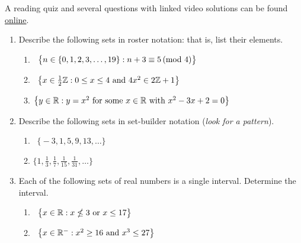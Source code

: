 \begin{exercises}{}{}
	A reading quiz and several questions with linked video solutions can be found \href{http://www.math.uci.edu/~ndonalds/math13/selftest/4-1-subset.html}{online}.



	\begin{enumerate}
	  \item Describe the following sets in roster notation: that is, list their elements.
		\begin{enumerate}
		  \item {} \ $\bigl\{n\in\{0,1,2,3,\ldots,19\}:n+3\equiv 5\negthickspace\pmod{4}\bigr\}$
		  \setcounter{enumii}{2}
		  \item {} \ $\bigl\{x\in \frac 12\mathbb{Z}: 0\le x\le 4\text{ and }4x^2\in 2\mathbb{Z}+1\bigr\}$
		  \setcounter{enumii}{4}
		  \item $\bigl\{y\in\mathbb{R}:y=x^2\text{ for some $x\in\mathbb{R}$ with } x^2-3x+2=0\bigr\}$
		\end{enumerate}
			
			
		\item Describe the following sets in set-builder notation (\emph{look for a pattern}).
		\begin{enumerate}
		  \item {} \ $\bigl\{-3,1,5,9,13,\ldots\bigr\}$
		  \setcounter{enumii}{2}
		  \item $\bigl\{1,\frac 13,\frac 17,\frac 1{15},\frac 1{31},\ldots\bigr\}$
		\end{enumerate}
		  
	
	  \item Each of the following sets of real numbers is a single interval. Determine the interval.
		\begin{enumerate}
		  \item {} \ $\bigl\{x\in\mathbb{R}:x\nleq 3\text{ or }x\le 17\bigr\}$
		  \setcounter{enumii}{2}
		  \item {} \ $\bigl\{x\in\mathbb{R}^-:x^2\ge 16\text{ and }x^3\le 27\bigr\}$
		\end{enumerate}
			

\end{enumerate}
\end{exercises}
